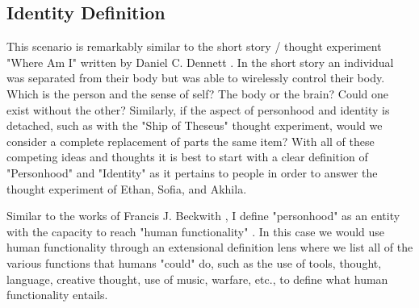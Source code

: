 \documentclass[
	letterpaper, %
]{jdf}
\begin{document}

\subsection{Identity Definition}
This scenario is remarkably similar to the short story / thought experiment "Where Am I" written by Daniel C. Dennett \citep{Dennett1978-DENWAI}. In the short story an individual was separated from their body but was able to wirelessly control their body. Which is the person and the sense of self? The body or the brain? Could one exist without the other? Similarly, if the aspect of personhood and identity is detached, such as with the "Ship of Theseus" thought experiment, would we consider a complete replacement of parts the same item? With all of these competing ideas and thoughts it is best to start with a clear definition of "Personhood" and "Identity" as it pertains to people in order to answer the thought experiment of Ethan, Sofia, and Akhila. 

Similar to the works of Francis J. Beckwith , I define "personhood" as an entity with the capacity to reach "human functionality" \citep{Beckwith}. In this case we would use human functionality through an extensional definition lens where we list all of the various functions that humans "could" do, such as the use of tools, thought, language, creative thought, use of music, warfare, etc., to define what human functionality entails.
\end{document}
